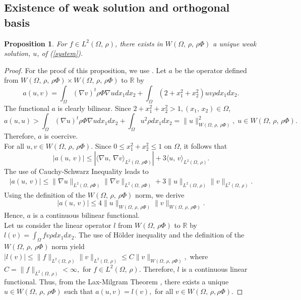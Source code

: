 \documentclass[11pt]{article}
\newtheorem{proposition}[theorem]{Proposition}
\begin{document}
	\subsection{Existence of weak solution and orthogonal basis}
	\begin{proposition}\label{EXIST} For $f\in L^2\left(\Omega,\,\rho \right)$, there exists  in  $W(\Omega,\,\rho ,\,\rho \Phi)$ a unique weak solution, $u$, of  (\ref{system}).
	\end{proposition}
	\begin{proof}
		For the proof of this proposition, we use \cite[Theorem II.2.5]{BOYER}.
		Let $a$ be the operator defined   from $W(\Omega,\,\rho ,\,\rho \Phi)\times W(\Omega,\,\rho ,\,\rho \Phi)$ to $\mathbb{R}$ by 
		$$ a(u,v)=	\int_{\Omega}(\nabla v)^t\rho \Phi\nabla udx_1dx_2+\int_{\Omega}\left(2+{x_1^2+x_2^2}\right)uv\rho dx_1dx_2.$$  The functional $a$  is clearly bilinear. Since $2+x_1^2+x_2^2>1, (x_1,\,x_2)\in\Omega$,
		$$ a(u,u)>\int_{\Omega}(\nabla u)^t\rho \Phi\nabla udx_1dx_2+\int_{\Omega}u^2\rho dx_1dx_2=\|u\|_{W(\Omega,\,\rho ,\,\rho \Phi)}^2,\;u\in W(\Omega,\,\rho ,\,\rho \Phi).$$
		 Therefore, 
		$a$ is coercive.\\ For all $u,v\in W\left(\Omega,\,\rho ,\,\rho \Phi\right).$ Since $0\leq x_1^2+x_2^2\leq 1$ on $\Omega$, it follows that
		$$|a(u,\,v)|\leq |\langle \nabla u,\,\nabla v\rangle_{L^2(\Omega,\,\rho \Phi)}|+3\langle u,\,v\rangle_{L^2(\Omega,\,\rho )}.$$ The use of Cauchy-Schwarz Inequality leads to
		\begin{align*}
			|a(u,\,v)|\leq \|\nabla u\|_{L^2(\Omega,\,\rho \Phi)}\|\nabla v\|_{L^2(\Omega,\,\rho \Phi)}+3\|u\|_{L^2(\Omega,\,\rho )}\|v\|_{L^2(\Omega,\,\rho )}.
		\end{align*}
		 Using the definition of the $W\left(\Omega,\,\rho ,\,\rho \Phi\right)$ norm, we derive
		$$|a(u,\,v)|\leq 4 \|u\|_{W(\Omega,\,\rho ,\,\rho \Phi)}\|v\|_{W(\Omega,\,\rho ,\,\rho \Phi)}.$$ Hence, $a$ is a continuous bilinear functional.\\
		Let us consider the linear operator $l$ from $W(\Omega,\,\rho \Phi)$ to $\mathbb{R}$ by $l(v)=\int_{\Omega}fv\rho dx_1dx_2$. The use of H\"older inequality and the definition of  the $W\left(\Omega,\,\rho ,\,\rho \Phi\right)$ norm yield  $|l(v)|\leq \|f\|_{L^2(\Omega,\,\rho )}\|v\|_{L^2(\Omega,\,\rho )}\leq C\|v\|_{W\left(\Omega,\,\rho ,\,\rho \Phi\right)},$ where $C=\|f\|_{L^2(\Omega,\,\rho )}<\infty,$ for $f\in L^2(\Omega,\,\rho )$. Therefore, $l$ is a continuous linear functional.  Thus, from the Lax-Milgram Theorem \cite[Theorem II.2.5 ]{BOYER}, there exists a unique $u\in W\left(\Omega,\,\rho ,\,\rho \Phi\right)$ such that $a(u,v)=l(v),$ for all $v\in W\left(\Omega,\, \rho ,\rho \Phi\right).$ 
	\end{proof}
	
\end{document}
